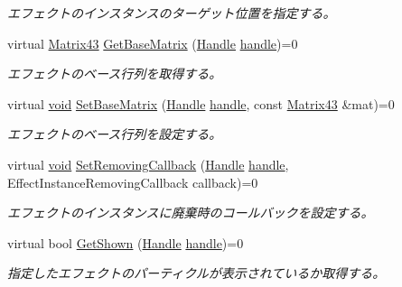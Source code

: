 \begin{DoxyCompactItemize}
\begin{DoxyCompactList}\small\item\em エフェクトのインスタンスのターゲット位置を指定する。 \end{DoxyCompactList}\item 
virtual \mbox{\hyperlink{struct_effekseer_1_1_matrix43}{Matrix43}} \mbox{\hyperlink{class_effekseer_1_1_manager_a095085007e1df5de623fea1a96c31a04}{Get\+Base\+Matrix}} (\mbox{\hyperlink{namespace_effekseer_afba58b8d812da862190e9bbfc040824a}{Handle}} \mbox{\hyperlink{namespace_effekseer_afd99b336b206999bdcca3e431648efbc}{handle}})=0
\begin{DoxyCompactList}\small\item\em エフェクトのベース行列を取得する。 \end{DoxyCompactList}\item 
virtual \mbox{\hyperlink{namespace_effekseer_ab34c4088e512200cf4c2716f168deb56}{void}} \mbox{\hyperlink{class_effekseer_1_1_manager_a0f94ad0b6cd362283bc216515a89822c}{Set\+Base\+Matrix}} (\mbox{\hyperlink{namespace_effekseer_afba58b8d812da862190e9bbfc040824a}{Handle}} \mbox{\hyperlink{namespace_effekseer_afd99b336b206999bdcca3e431648efbc}{handle}}, const \mbox{\hyperlink{struct_effekseer_1_1_matrix43}{Matrix43}} \&mat)=0
\begin{DoxyCompactList}\small\item\em エフェクトのベース行列を設定する。 \end{DoxyCompactList}\item 
virtual \mbox{\hyperlink{namespace_effekseer_ab34c4088e512200cf4c2716f168deb56}{void}} \mbox{\hyperlink{class_effekseer_1_1_manager_a62c24747994008dfcb84a0adcd53b3ad}{Set\+Removing\+Callback}} (\mbox{\hyperlink{namespace_effekseer_afba58b8d812da862190e9bbfc040824a}{Handle}} \mbox{\hyperlink{namespace_effekseer_afd99b336b206999bdcca3e431648efbc}{handle}}, Effect\+Instance\+Removing\+Callback callback)=0
\begin{DoxyCompactList}\small\item\em エフェクトのインスタンスに廃棄時のコールバックを設定する。 \end{DoxyCompactList}\item 
virtual bool \mbox{\hyperlink{class_effekseer_1_1_manager_a200e7b1812c128a4d88cca7d1be57c0e}{Get\+Shown}} (\mbox{\hyperlink{namespace_effekseer_afba58b8d812da862190e9bbfc040824a}{Handle}} \mbox{\hyperlink{namespace_effekseer_afd99b336b206999bdcca3e431648efbc}{handle}})=0
\begin{DoxyCompactList}\small\item\em 指定したエフェクトのパーティクルが表示されているか取得する。 \end{DoxyCompactList}\item 

\end{DoxyCompactItemize}
